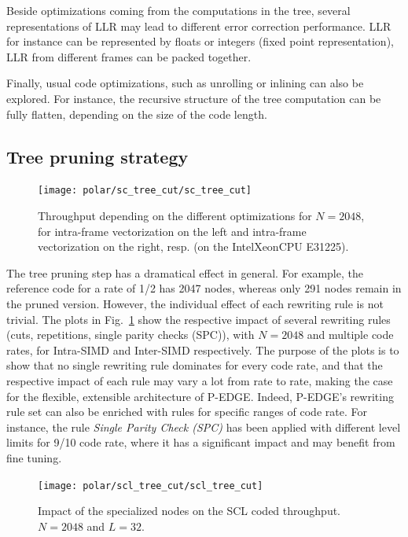 Beside optimizations coming from the computations in the tree, several
representations of LLR may lead to different error correction performance. LLR
for instance can be represented by floats or integers (fixed point
representation), LLR from different frames can be packed together.

Finally, usual code optimizations, such as unrolling or inlining can also be
explored. For instance, the recursive structure of the tree computation can be
fully flatten, depending on the size of the code length.

\subsection{Tree pruning strategy}

\begin{figure}[htp]
\texttt{[image: polar/sc\_tree\_cut/sc\_tree\_cut]}
\caption{Throughput depending on the different optimizations for $N = 2048$, for
  intra-frame vectorization on the left and intra-frame vectorization on the
  right, resp. (on the Intel\R Xeon\TM CPU E31225).}
\label{plot:polar_sc_tree_cut}
\end{figure}

The tree pruning step has a dramatical effect in general. For example, the
reference code for a rate of 1/2 has 2047 nodes, whereas only 291 nodes remain
in the pruned version. However, the individual effect of each rewriting rule is
not trivial. The plots in Fig.~\ref{plot:polar_sc_tree_cut} show the respective
impact of several rewriting rules (cuts, repetitions, single parity checks
(SPC)), with $N = 2048$ and multiple code rates, for Intra-SIMD and Inter-SIMD
respectively. The purpose of the plots is to show that no single rewriting rule
dominates for every code rate, and that the respective impact of each rule may
vary a lot from rate to rate, making the case for the flexible, extensible
architecture of P-EDGE. Indeed, P-EDGE's rewriting rule set can also be enriched
with rules for specific ranges of code rate. For instance, the rule
\emph{Single Parity Check (SPC)} has been applied with different level limits
for 9/10 code rate, where it has a significant impact and may benefit from fine
tuning.

\begin{figure}
  \centering
  \texttt{[image: polar/scl\_tree\_cut/scl\_tree\_cut]}
  \caption{Impact of the specialized nodes on the SCL coded throughput.
    $N=2048$ and $L=32$.}
  \label{plot:polar_scl_tree_cut}
\end{figure}

